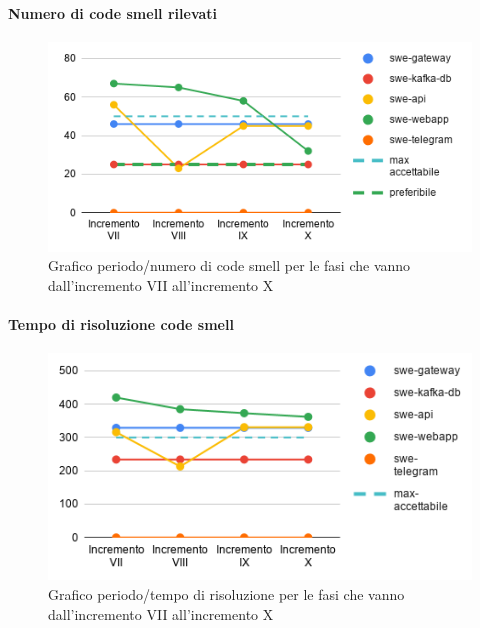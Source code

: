 \paragraph{Numero di code smell rilevati}
\begin{figure}[H]
			\centering
			\includegraphics[width=0.8\linewidth]{./res/images/QM-PROD-13-NCS.png}
			\caption{Grafico periodo/numero di code smell per le fasi che vanno dall'incremento VII all'incremento X}
			\label{fig:Grafico periodo/rischio per le fasi che vanno dall'incremento VII all'incremento X}
	\end{figure}
\paragraph{Tempo di risoluzione code smell}
\begin{figure}[H]
			\centering
			\includegraphics[width=0.8\linewidth]{./res/images/QM-PROD-14-TCS.png}
			\caption{Grafico periodo/tempo di risoluzione per le fasi che vanno dall'incremento VII all'incremento X}
			\label{fig:Grafico periodo/tempo di risoluzione per le fasi che vanno dall'incremento VII all'incremento X}
	\end{figure}
